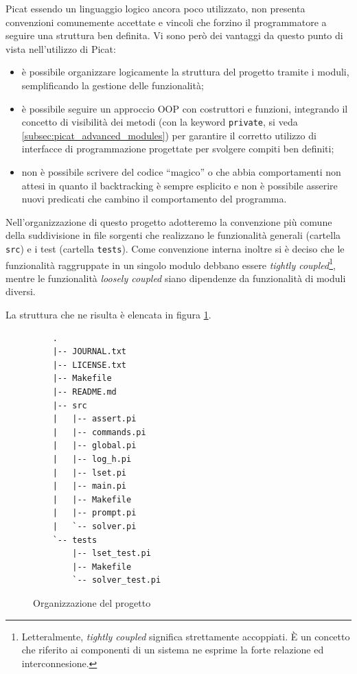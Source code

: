 \documentclass[12pt,a4paper,openright]{book} %
\begin{document}
Picat essendo un linguaggio logico ancora poco utilizzato, non
presenta convenzioni comunemente accettate e vincoli che forzino il
programmatore a seguire una struttura ben definita. Vi sono però dei
vantaggi da questo punto di vista nell'utilizzo di Picat:
\begin{itemize}
	\item è possibile organizzare logicamente la struttura del
          progetto tramite i moduli, semplificando la gestione delle
          funzionalità;
	\item è possibile seguire un approccio OOP con costruttori e
          funzioni, integrando il concetto di visibilità dei metodi
          (con la keyword \texttt{private}, si veda
          \ref{subsec:picat_advanced_modules}) per garantire il corretto
          utilizzo di interfacce di programmazione progettate per
          svolgere compiti ben definiti;
	\item non è possibile scrivere del codice ``magico'' o che
          abbia comportamenti non attesi in quanto il backtracking è
          sempre esplicito e non è possibile asserire nuovi predicati
          che cambino il comportamento del programma.
\end{itemize}

Nell'organizzazione di questo progetto adotteremo la convenzione più
comune della suddivisione in file sorgenti che realizzano le
funzionalità generali (cartella \texttt{src}) e i test (cartella
\texttt{tests}). Come convenzione interna inoltre si è deciso che le
funzionalità raggruppate in un singolo modulo debbano essere
\textit{tightly coupled}\footnote{Letteralmente, \textit{tightly
    coupled} significa strettamente accoppiati. \`E un concetto che
  riferito ai componenti di un sistema ne esprime la forte relazione
  ed interconnesione.}, mentre le funzionalità \textit{loosely
  coupled} siano dipendenze da funzionalità di moduli diversi.

La struttura che ne risulta è elencata in figura
\ref{fig:proj_folder_structure}.

\begin{figure}[]
	\label{fig:proj_folder_structure}
	\begin{verbatim}
	.
	|-- JOURNAL.txt
	|-- LICENSE.txt
	|-- Makefile
	|-- README.md
	|-- src
	|   |-- assert.pi
	|   |-- commands.pi
	|   |-- global.pi
	|   |-- log_h.pi
	|   |-- lset.pi
	|   |-- main.pi
	|   |-- Makefile
	|   |-- prompt.pi
	|   `-- solver.pi
	`-- tests
	    |-- lset_test.pi
	    |-- Makefile
	    `-- solver_test.pi
	\end{verbatim}
	\caption{Organizzazione del progetto}
\end{figure}
\end{document}

